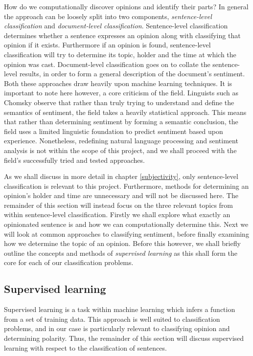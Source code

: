 How do we computationally discover opinions and identify their parts? In general the approach can be loosely split into two components, \emph{sentence-level classification} and \emph{document-level classification}. Sentence-level classification determines whether a sentence expresses an opinion along with classifying that opinion if it exists. Furthermore if an opinion is found, sentence-level classification will try to determine its topic, holder and the time at which the opinion was cast. Document-level classification goes on to collate the sentence-level results, in order to form a general description of the document's sentiment. Both these approaches draw heavily upon machine learning techniques. It is important to note here however, a core criticism of the field. Linguists such as Chomsky \cite{norvig} observe that rather than truly trying to understand and define the semantics of sentiment, the field takes a heavily statistical approach. This means that rather than determining sentiment by forming a semantic conclusion, the field uses a limited linguistic foundation to predict sentiment based upon experience. Nonetheless, redefining natural language processing and sentiment analysis is not within the scope of this project, and we shall proceed with the field's successfully tried and tested approaches.

As we shall discuss in more detail in chapter \ref{subjectivity}, only sentence-level classification is relevant to this project. Furthermore, methods for determining an opinion's holder and time are unnecessary and will not be discussed here. The remainder of this section will instead focus on the three relevant topics from within sentence-level classification. Firstly we shall explore what exactly an opinionated sentence is and how we can computationally determine this. Next we will look at common approaches to classifying sentiment, before finally examining how we determine the topic of an opinion. Before this however, we shall briefly outline the concepts and methods of \emph{supervised learning} as this shall form the core for each of our classification problems.

\subsection{Supervised learning}
\label{background:supervised_learning}

Supervised learning is a task within machine learning which infers a function from a set of training data. This approach is well suited to classification problems, and in our case is particularly relevant to classifying opinion and determining polarity. Thus, the remainder of this section will discuss supervised learning with respect to the classification of sentences. 

